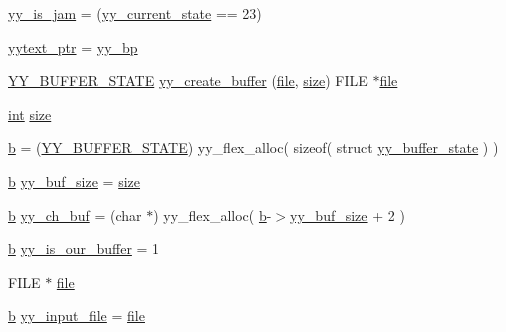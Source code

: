 \begin{DoxyCompactItemize}
\item 
\mbox{\hyperlink{expr-lex_8cpp_a7494532160b510aa4e49743e9be97259}{yy\+\_\+is\+\_\+jam}} = (\mbox{\hyperlink{expr-lex_8cpp_abb8b9672f94e21056888ae611b41cd1b}{yy\+\_\+current\+\_\+state}} == 23)
\item 
\mbox{\hyperlink{expr-lex_8cpp_ad6fabaea416e87b0f79fc34741e70818}{yytext\+\_\+ptr}} = \mbox{\hyperlink{expr-lex_8cpp_a71cf769ce518e8687bf8999b278c65f4}{yy\+\_\+bp}}
\item 
\mbox{\hyperlink{expr-lex_8cpp_a4e5bd2d129903df83f3d13effaf8f3e4}{Y\+Y\+\_\+\+B\+U\+F\+F\+E\+R\+\_\+\+S\+T\+A\+TE}} \mbox{\hyperlink{expr-lex_8cpp_a55588ac24161be2160e907e019dcae5c}{yy\+\_\+create\+\_\+buffer}} (\mbox{\hyperlink{expr-lex_8cpp_a702945180aa732857b380a007a7e2a21}{file}}, \mbox{\hyperlink{expr-lex_8cpp_ab7d671599a7b25ca99a487fa341bc33a}{size}}) F\+I\+LE $\ast$\mbox{\hyperlink{expr-lex_8cpp_a702945180aa732857b380a007a7e2a21}{file}}
\item 
\mbox{\hyperlink{_util_8cpp_a0ef32aa8672df19503a49fab2d0c8071}{int}} \mbox{\hyperlink{expr-lex_8cpp_ab7d671599a7b25ca99a487fa341bc33a}{size}}
\item 
\mbox{\hyperlink{expr-lex_8cpp_a91b64995742fd30063314f12340b4b5a}{b}} = (\mbox{\hyperlink{expr-lex_8cpp_a4e5bd2d129903df83f3d13effaf8f3e4}{Y\+Y\+\_\+\+B\+U\+F\+F\+E\+R\+\_\+\+S\+T\+A\+TE}}) yy\+\_\+flex\+\_\+alloc( sizeof( struct \mbox{\hyperlink{structyy__buffer__state}{yy\+\_\+buffer\+\_\+state}} ) )
\item 
\mbox{\hyperlink{expr-lex_8cpp_a91b64995742fd30063314f12340b4b5a}{b}} \mbox{\hyperlink{expr-lex_8cpp_a969f40813585d053e9cceaec3fe16f58}{yy\+\_\+buf\+\_\+size}} = \mbox{\hyperlink{expr-lex_8cpp_ab7d671599a7b25ca99a487fa341bc33a}{size}}
\item 
\mbox{\hyperlink{expr-lex_8cpp_a91b64995742fd30063314f12340b4b5a}{b}} \mbox{\hyperlink{expr-lex_8cpp_a49f3339224f2ff52f9191b351b184dbd}{yy\+\_\+ch\+\_\+buf}} = (char $\ast$) yy\+\_\+flex\+\_\+alloc( \mbox{\hyperlink{expr-lex_8cpp_a91b64995742fd30063314f12340b4b5a}{b}}-\/$>$\mbox{\hyperlink{expr-lex_8cpp_a969f40813585d053e9cceaec3fe16f58}{yy\+\_\+buf\+\_\+size}} + 2 )
\item 
\mbox{\hyperlink{expr-lex_8cpp_a91b64995742fd30063314f12340b4b5a}{b}} \mbox{\hyperlink{expr-lex_8cpp_a725031cce2e48e1e5c7f713146ed73bc}{yy\+\_\+is\+\_\+our\+\_\+buffer}} = 1
\item 
F\+I\+LE $\ast$ \mbox{\hyperlink{expr-lex_8cpp_a702945180aa732857b380a007a7e2a21}{file}}
\item 
\mbox{\hyperlink{expr-lex_8cpp_a91b64995742fd30063314f12340b4b5a}{b}} \mbox{\hyperlink{expr-lex_8cpp_af6c25e1253452c8f667697b573db784f}{yy\+\_\+input\+\_\+file}} = \mbox{\hyperlink{expr-lex_8cpp_a702945180aa732857b380a007a7e2a21}{file}}

\end{DoxyCompactItemize}
